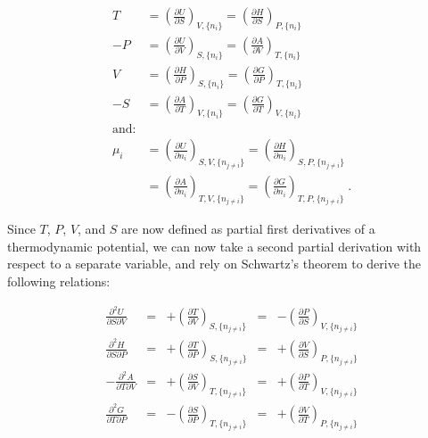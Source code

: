 \documentclass[
  9pt,
]{extbook}
\theoremstyle{definition}
\theoremstyle{definition}
\theoremstyle{definition}
\theoremstyle{remark}
\begin{document}
\begin{equation}
\begin{aligned}
 T &= \left(\frac{\partial U}{\partial S} \right)_{V,\{n_i\}} = \left(\frac{\partial H}{\partial S} \right)_{P,\{n_i\}}  \\
-P &= \left(\frac{\partial U}{\partial V} \right)_{S,\{n_i\}} = \left(\frac{\partial A}{\partial V} \right)_{T,\{n_i\}}  \\
 V &= \left(\frac{\partial H}{\partial P} \right)_{S,\{n_i\}} = \left(\frac{\partial G}{\partial P} \right)_{T,\{n_i\}}  \\
-S &= \left(\frac{\partial A}{\partial T} \right)_{V,\{n_i\}} = \left(\frac{\partial G}{\partial T} \right)_{V,\{n_i\}}  \\
\text{and:}
\\
 \mu_i &=  \left(\frac{\partial U}{\partial n_i} \right)_{S,V,\{n_{j \neq i}\}} =  \left(\frac{\partial H}{\partial n_i} \right)_{S,P,\{n_{j \neq i}\}} \\
       &= \left(\frac{\partial A}{\partial n_i} \right)_{T,V,\{n_{j \neq i}\}} = \left(\frac{\partial G}{\partial n_i} \right)_{T,P,\{n_{j \neq i}\}}\;.
\end{aligned}
\label{eq:dhagchem3}
\end{equation}

Since \(T\), \(P\), \(V\), and \(S\) are now defined as partial first derivatives of a thermodynamic potential, we can now take a second partial derivation with respect to a separate variable, and rely on Schwartz's theorem to derive the following relations:

\begin{equation}
\begin{aligned}
\frac{\partial^2 U }{\partial S \partial V} &=& +\left(\frac{\partial T}{\partial V}\right)_{S,\{n_{j \neq i}\}} &=& -\left(\frac{\partial P}{\partial S}\right)_{V,\{n_{j \neq i}\}}   \\
\frac{\partial^2 H }{\partial S \partial P} &=& +\left(\frac{\partial T}{\partial P}\right)_{S,\{n_{j \neq i}\}} &=& +\left(\frac{\partial V}{\partial S}\right)_{P,\{n_{j \neq i}\}}  \\
-\frac{\partial^2 A }{\partial T \partial V} &=& +\left(\frac{\partial S}{\partial V}\right)_{T,\{n_{j \neq i}\}} &=& +\left(\frac{\partial P}{\partial T}\right)_{V,\{n_{j \neq i}\}}  \\
\frac{\partial^2 G }{\partial T \partial P} &=& -\left(\frac{\partial S}{\partial P}\right)_{T,\{n_{j \neq i}\}} &=& +\left(\frac{\partial V}{\partial T}\right)_{P,\{n_{j \neq i}\}}
\end{aligned}
\label{eq:maxrelf}
\end{equation}
\end{document}
